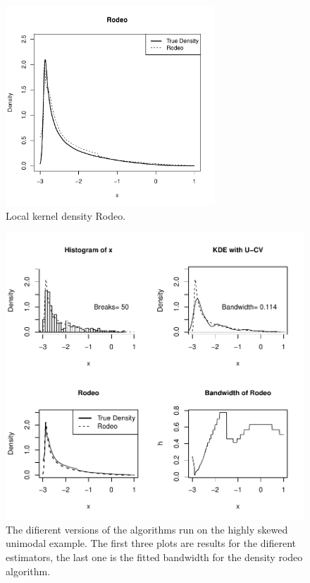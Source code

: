 \begin{figure}[t]
 \centering
 \includegraphics[width=0.7\textwidth]{pic/pic1.pdf}
 \caption{Local kernel density Rodeo.}
 \label{fig:1d rodeo 1}
\end{figure}

\begin{figure}[ht]
    \centering
    \includegraphics[width=1\textwidth]{pic/pic2.pdf}
    \caption{The difierent versions of the algorithms run on the highly skewed unimodal example. The first three plots are results for the difierent estimators, the last one is the fitted bandwidth for the density rodeo algorithm.}
    \label{fig: 1d rodeo 4in1}
\end{figure}


